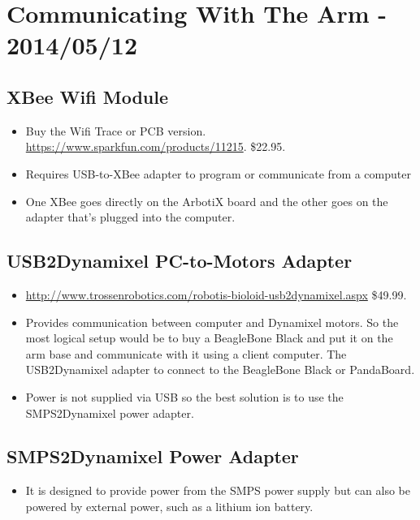 \documentclass[letterpaper, 10 pt]{article}
\begin{document}

\section{Communicating With The Arm - 2014/05/12}
  \subsection{XBee Wifi Module}
    \begin{itemize}
      \item Buy the Wifi Trace or PCB version. \url{https://www.sparkfun.com/products/11215}. \$22.95.
      \item Requires USB-to-XBee adapter to program or communicate from a computer
      \item One XBee goes directly on the ArbotiX board and the other goes on the adapter that's plugged into the computer.
    \end{itemize}
  \subsection{USB2Dynamixel PC-to-Motors Adapter}
    \begin{itemize}
      \item \url{http://www.trossenrobotics.com/robotis-bioloid-usb2dynamixel.aspx} \$49.99.
      \item Provides communication between computer and Dynamixel motors. So the most logical setup would be to buy a BeagleBone Black and put it on the arm base and communicate with it using a client computer. The USB2Dynamixel adapter to connect to the BeagleBone Black or PandaBoard.
      \item Power is not supplied via USB so the best solution is to use the SMPS2Dynamixel power adapter.
    \end{itemize}
  \subsection{SMPS2Dynamixel Power Adapter}
    \begin{itemize}
      \item It is designed to provide power from the SMPS power supply but can also be powered by external power, such as a lithium ion battery.
    \end{itemize}

%

\end{document}
